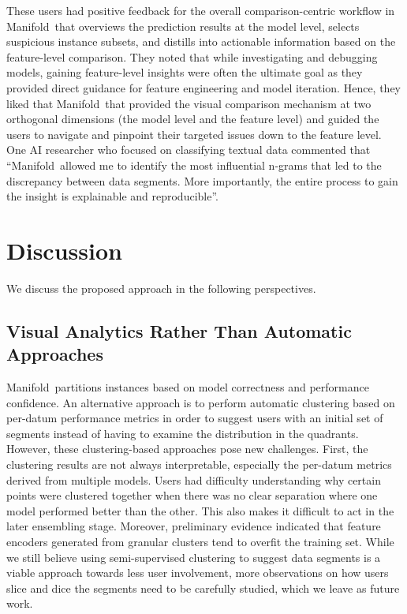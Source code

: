 \documentclass[preprint,journal]{vgtc}       %
\newcommand{\techname}{Manifold}
\begin{document}
These users had positive feedback for the overall comparison-centric workflow in \techname\ that overviews the prediction results at the model level, selects suspicious instance subsets, and distills into actionable information based on the feature-level comparison. They noted that while investigating and debugging models, gaining feature-level insights were often the ultimate goal as they provided direct guidance for feature engineering and model iteration. Hence, they liked that \techname\ that provided the visual comparison mechanism at two orthogonal dimensions (the model level and the feature level) and guided the users to navigate and pinpoint their targeted issues down to the feature level. One AI researcher who focused on classifying textual data commented that ``\techname\ allowed me to identify the most influential n-grams that led to the discrepancy between data segments. More importantly, the entire process to gain the insight is explainable and reproducible''.

\color{black}

\section{Discussion}
We discuss the proposed approach in the following perspectives.

\subsection{Visual Analytics Rather Than Automatic Approaches}

\techname\ partitions instances based on model correctness and performance confidence. An alternative approach is to perform automatic clustering based on per-datum performance metrics in order to suggest users with an initial set of segments instead of having to examine the distribution in the quadrants. However, these clustering-based approaches pose new challenges. First, the clustering results are not always interpretable, especially the per-datum metrics derived from multiple models. Users had difficulty understanding why certain points were clustered together when there was no clear separation where one model performed better than the other. This also makes it difficult to act in the later ensembling stage. Moreover, preliminary evidence indicated that feature encoders generated from granular clusters tend to overfit the training set. While we still believe using semi-supervised clustering to suggest data segments is a viable approach towards less user involvement, more observations on how users slice and dice the segments need to be carefully studied, which we leave as future work.
\end{document}
